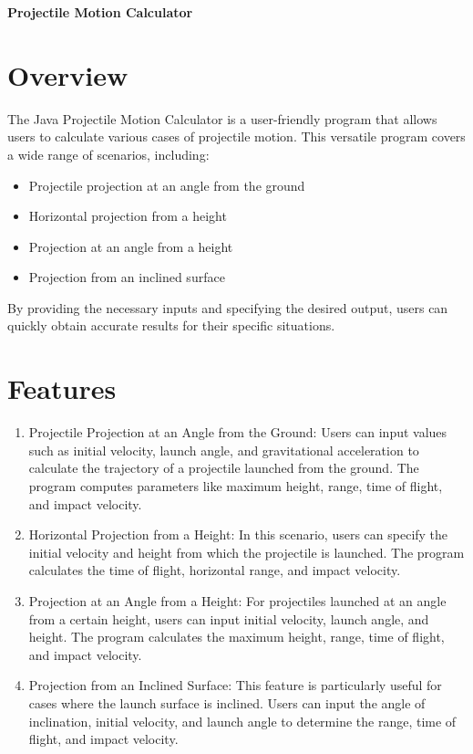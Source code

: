 \documentclass{article}
\begin{document}
    \begin{center}
        \Huge\textbf{Projectile Motion Calculator}
    \end{center}



\section*{Overview}
The Java Projectile Motion Calculator is a user-friendly program that allows users to calculate various cases of projectile motion. This versatile program covers a wide range of scenarios, including:
\begin{itemize}
  \item Projectile projection at an angle from the ground
  \item Horizontal projection from a height
  \item Projection at an angle from a height
  \item Projection from an inclined surface
\end{itemize}

By providing the necessary inputs and specifying the desired output, users can quickly obtain accurate results for their specific situations.



\section*{Features}
\begin{enumerate}
  \item Projectile Projection at an Angle from the Ground: Users can input values such as initial velocity, launch angle, and gravitational acceleration to calculate the trajectory of a projectile launched from the ground. The program computes parameters like maximum height, range, time of flight, and impact velocity.
  
  \item Horizontal Projection from a Height: In this scenario, users can specify the initial velocity and height from which the projectile is launched. The program calculates the time of flight, horizontal range, and impact velocity.
  
  \item Projection at an Angle from a Height: For projectiles launched at an angle from a certain height, users can input initial velocity, launch angle, and height. The program calculates the maximum height, range, time of flight, and impact velocity.
  
  \item Projection from an Inclined Surface: This feature is particularly useful for cases where the launch surface is inclined. Users can input the angle of inclination, initial velocity, and launch angle to determine the range, time of flight, and impact velocity.
\end{enumerate}
\end{document}
